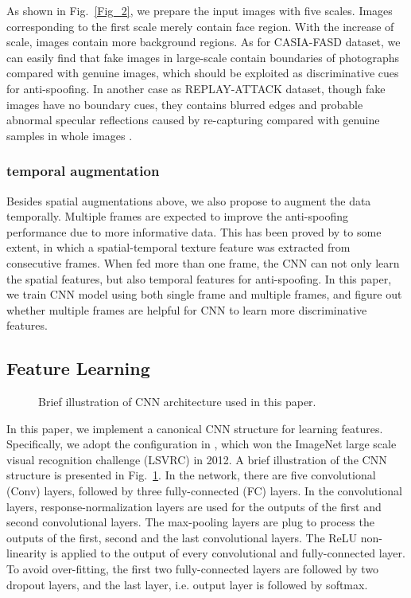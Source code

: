 \documentclass[letterpaper, 10 pt, conference]{ieeeconf}
\begin{document}
As shown in Fig.~\ref{Fig_2}, we prepare the input images with five scales. Images corresponding to the first scale merely contain face region. With the increase of scale, images contain more background regions. As for CASIA-FASD dataset, we can easily find that fake images in large-scale contain boundaries of photographs compared with genuine images, which should be exploited as discriminative cues for anti-spoofing. In another case as REPLAY-ATTACK dataset, though fake images have no boundary cues, they contains blurred edges and probable abnormal specular reflections caused by re-capturing compared with genuine samples in whole images \cite{Face_Anti_Spoofing_JianweiYang_2013}.

\subsubsection{temporal augmentation}

Besides spatial augmentations above, we also propose to augment the data temporally. Multiple frames are expected to improve the anti-spoofing performance due to more informative data. This has been proved by \cite{de2013lbp} to some extent, in which a spatial-temporal texture feature was extracted from consecutive frames. When fed more than one frame, the CNN can not only learn the spatial features, but also temporal features for anti-spoofing. In this paper, we train CNN model using both single frame and multiple frames, and figure out whether multiple frames are helpful for CNN to learn more discriminative features. 

\subsection{Feature Learning}

\begin{figure}
\begin{minipage}[b]{1\linewidth}
\centering
\centerline{}
\end{minipage}
\caption{Brief illustration of CNN architecture used in this paper.}
\label{Fig_4}
\end{figure}

In this paper, we implement a canonical CNN structure for learning features. Specifically, we adopt the configuration in \cite{DBLP:conf/nips/KrizhevskySH12}, which won the ImageNet large scale visual recognition challenge (LSVRC) in 2012. A brief illustration of the CNN structure is presented in Fig.~\ref{Fig_4}. In the network, there are five convolutional (Conv) layers, followed by three fully-connected (FC) layers. In the convolutional layers, response-normalization layers are used for the outputs of the first and second convolutional layers. The max-pooling layers are plug to process the outputs of the first, second and the last convolutional layers. The ReLU non-linearity is applied to the output of every convolutional and fully-connected layer. To avoid over-fitting, the first two fully-connected layers are followed by two dropout layers, and the last layer, i.e. output layer is followed by softmax.
\end{document}

